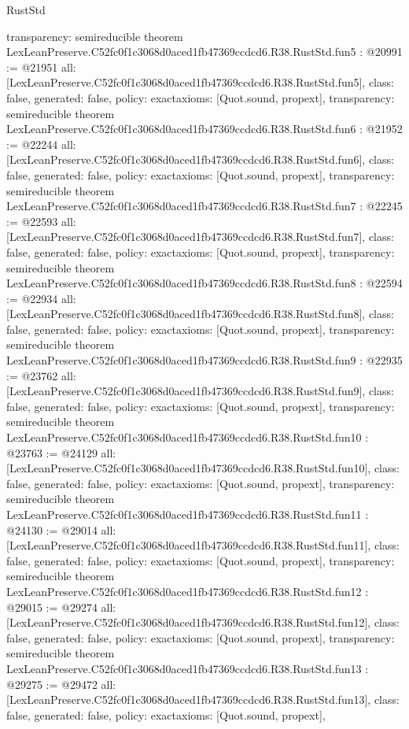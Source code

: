 \begin{lexlean}{RustStd}
\begin{coremodule}
{  transparency: semireducible
}
theorem LexLeanPreserve.C52fc0f1c3068d0aced1fb47369ccdcd6.R38.RustStd.fun5 : @20991 := @21951 {
  all: [LexLeanPreserve.C52fc0f1c3068d0aced1fb47369ccdcd6.R38.RustStd.fun5],
  class: false,
  generated: false,
  policy: exact{axioms: [Quot.sound, propext]},
  transparency: semireducible
}
theorem LexLeanPreserve.C52fc0f1c3068d0aced1fb47369ccdcd6.R38.RustStd.fun6 : @21952 := @22244 {
  all: [LexLeanPreserve.C52fc0f1c3068d0aced1fb47369ccdcd6.R38.RustStd.fun6],
  class: false,
  generated: false,
  policy: exact{axioms: [Quot.sound, propext]},
  transparency: semireducible
}
theorem LexLeanPreserve.C52fc0f1c3068d0aced1fb47369ccdcd6.R38.RustStd.fun7 : @22245 := @22593 {
  all: [LexLeanPreserve.C52fc0f1c3068d0aced1fb47369ccdcd6.R38.RustStd.fun7],
  class: false,
  generated: false,
  policy: exact{axioms: [Quot.sound, propext]},
  transparency: semireducible
}
theorem LexLeanPreserve.C52fc0f1c3068d0aced1fb47369ccdcd6.R38.RustStd.fun8 : @22594 := @22934 {
  all: [LexLeanPreserve.C52fc0f1c3068d0aced1fb47369ccdcd6.R38.RustStd.fun8],
  class: false,
  generated: false,
  policy: exact{axioms: [Quot.sound, propext]},
  transparency: semireducible
}
theorem LexLeanPreserve.C52fc0f1c3068d0aced1fb47369ccdcd6.R38.RustStd.fun9 : @22935 := @23762 {
  all: [LexLeanPreserve.C52fc0f1c3068d0aced1fb47369ccdcd6.R38.RustStd.fun9],
  class: false,
  generated: false,
  policy: exact{axioms: [Quot.sound, propext]},
  transparency: semireducible
}
theorem LexLeanPreserve.C52fc0f1c3068d0aced1fb47369ccdcd6.R38.RustStd.fun10 : @23763 := @24129 {
  all: [LexLeanPreserve.C52fc0f1c3068d0aced1fb47369ccdcd6.R38.RustStd.fun10],
  class: false,
  generated: false,
  policy: exact{axioms: [Quot.sound, propext]},
  transparency: semireducible
}
theorem LexLeanPreserve.C52fc0f1c3068d0aced1fb47369ccdcd6.R38.RustStd.fun11 : @24130 := @29014 {
  all: [LexLeanPreserve.C52fc0f1c3068d0aced1fb47369ccdcd6.R38.RustStd.fun11],
  class: false,
  generated: false,
  policy: exact{axioms: [Quot.sound, propext]},
  transparency: semireducible
}
theorem LexLeanPreserve.C52fc0f1c3068d0aced1fb47369ccdcd6.R38.RustStd.fun12 : @29015 := @29274 {
  all: [LexLeanPreserve.C52fc0f1c3068d0aced1fb47369ccdcd6.R38.RustStd.fun12],
  class: false,
  generated: false,
  policy: exact{axioms: [Quot.sound, propext]},
  transparency: semireducible
}
theorem LexLeanPreserve.C52fc0f1c3068d0aced1fb47369ccdcd6.R38.RustStd.fun13 : @29275 := @29472 {
  all: [LexLeanPreserve.C52fc0f1c3068d0aced1fb47369ccdcd6.R38.RustStd.fun13],
  class: false,
  generated: false,
  policy: exact{axioms: [Quot.sound, propext]},
}
\end{coremodule}
\end{lexlean}
